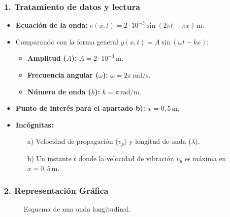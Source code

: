 \subsubsection*{1. Tratamiento de datos y lectura}
\begin{itemize}
    \item \textbf{Ecuación de la onda:} $e(x,t) = 2\cdot10^{-3}\sin(2\pi t - \pi x)\,\text{m}$.
    \item Comparando con la forma general $y(x,t)=A\sin(\omega t - kx)$:
        \begin{itemize}
            \item \textbf{Amplitud ($A$):} $A = 2\cdot10^{-3}\,\text{m}$.
            \item \textbf{Frecuencia angular ($\omega$):} $\omega = 2\pi\,\text{rad/s}$.
            \item \textbf{Número de onda ($k$):} $k = \pi\,\text{rad/m}$.
        \end{itemize}
    \item \textbf{Punto de interés para el apartado b):} $x = 0,5\,\text{m}$.
    \item \textbf{Incógnitas:}
        \begin{itemize}
            \item[a)] Velocidad de propagación ($v_p$) y longitud de onda ($\lambda$).
            \item[b)] Un instante $t$ donde la velocidad de vibración $v_y$ es máxima en $x=0,5\,\text{m}$.
        \end{itemize}
\end{itemize}

\subsubsection*{2. Representación Gráfica}
\begin{figure}[H]
    \centering
    \caption{Esquema de una onda longitudinal.}
\end{figure}

